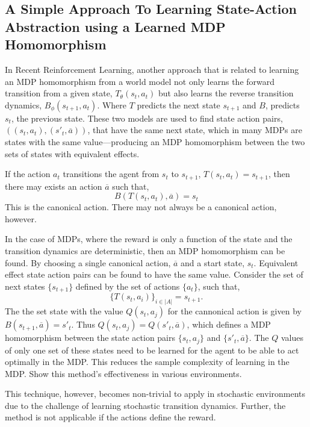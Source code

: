 \subsection{A Simple Approach To Learning State-Action Abstraction using a Learned MDP Homomorphism}
In Recent Reinforcement Learning, another approach that is related to learning an MDP homomorphism from a world model \cite{mavor2022simple} not only learns the forward transition from a given state, $T_\theta(s_t, a_t)$ but also learns the reverse transition dynamics, $B_\phi(s_{t+1}, a_t)$. Where $T$ predicts the next state $s_{t+1}$ and $B$, predicts $s_t$, the previous state. These two models are used to find state action pairs, $((s_t, a_t), (s'_t, \overline{a}))$,  that have the same next state, which in many MDPs are states with the same value—producing an MDP homomorphism between the two sets of states with equivalent effects.

If the action $a_t$ transitions the agent from $s_t$ to $s_{t+1}$, $T(s_t, a_t) = s_{t+1}$, then there may exists an action $\overline{a}$ such that,
\begin{equation}
	B(T(s_t, a_t), \overline{a}) = s_t
\end{equation}
This is the canonical action. There may not always be a canonical action, however.

In the case of MDPs, where the reward is only a function of the state and the transition dynamics are deterministic, then an MDP homomorphism can be found. By choosing a single canonical action, $\overline{a}$ and a start state, $s_t$. Equivalent effect state action pairs can be found to have the same value. Consider the set of next states $\{s_{t+1}\}$ defined by the set of actions $\{a_t\}$, such that,
\begin{equation}
	\{T(s_t, a_i)\}_{i \in |A| }= {s_{t+1}}.
\end{equation}
The the set state with the value $Q(s_t, a_j)$ for the cannonical action is given by $B(s_{t+1}, \overline{a}) = s'_t$. Thus $Q(s_t, a_j) = Q(s'_t, \overline{a})$, which defines a MDP homomorphism between the state action pairs $\{s_t, a_j\}$ and $\{s'_t, \overline{a}\}$. The $Q$ values of only one set of these states need to be learned for the agent to be able to act optimally in the MDP. This reduces the sample complexity of learning in the MDP. \cite{mavor2022simple} Show this method's effectiveness in various environments.

This technique, however, becomes non-trivial to apply in stochastic environments due to the challenge of learning stochastic transition dynamics. Further, the method is not applicable if the actions define the reward.




